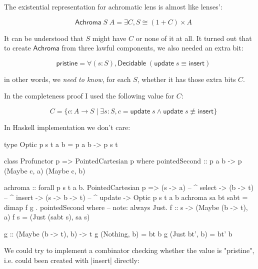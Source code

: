 \documentclass{article}
\begin{document}
The existential representation for achromatic lens is almost like lenses':

\begin{equation}
\quad \mathsf{Achroma}\;S\;A = \exists C, S \cong (1 + C) \times A
\end{equation}

It can be understood that $S$ might have $C$ or none of it at all.
It turned out that to create $\mathsf{Achroma}$ from three lawful components,
we also needed an extra bit:

\begin{equation}
\quad \mathsf{pristine} = \forall (s : S), \mathsf{Decidable}\;(\mathsf{update}\;s\equiv\mathsf{insert})
\end{equation}

in other words, we \emph{need to know}, for each $S$, whether it has those
extra bits $C$.

In the completeness proof I used the following value for $C$:

\begin{equation}
  \quad C = \{ c : A \to S \mid
  \exists s : S, c = \mathsf{update}\;s \land \mathsf{update}\; s \not\equiv \mathsf{insert}
  \}
\end{equation}

In Haskell implementation we don't care:

\begin{code}
type Optic p s t a b = p a b -> p s t

class Profunctor p => PointedCartesian p where
    pointedSecond :: p a b -> p (Maybe c, a) (Maybe c, b)

achroma
    :: forall p s t a b. PointedCartesian p
    => (s -> a)       -- ^ select
    -> (b -> t)       -- ^ insert
    -> (s -> b -> t)  -- ^ update
    -> Optic p s t a b
achroma sa bt sabt
    = dimap f g
    . pointedSecond
  where
    -- note: always Just.
    f :: s -> (Maybe (b -> t), a)
    f s = (Just (sabt s), sa s)

    g :: (Maybe (b -> t), b) -> t
    g (Nothing,  b) = bt b
    g (Just bt', b) = bt' b
\end{code}

We could try to implement a combinator checking whether the value is "pristine",
i.e. could been created with |insert| directly:

\end{document}
